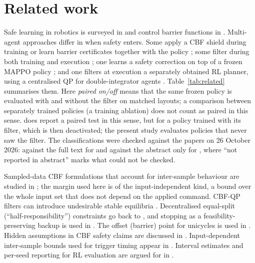 \documentclass[journal]{IEEEtran}
\begin{document}
\section{Related work}\label{sec:related}
Safe learning in robotics is surveyed in \cite{brunke2022} and control barrier functions in
\cite{ames2019}. Multi-agent approaches differ in when safety enters. Some apply a CBF shield during
training \cite{cai2021} or learn barrier certificates together with the policy
\cite{qin2021,zhang2025gcbf,zhang2025dgppo}; some filter during both training and execution
\cite{choi2025,dawood2025}; one learns a safety correction on top of a frozen MAPPO policy
\cite{deng2026}; and one filters at execution a separately obtained RL planner, using a centralised
QP for double-integrator agents \cite{vinod2022}. Table~\ref{tab:related} summarises them. Here
\emph{paired on/off} means that the same frozen policy is evaluated with and without the filter on
matched layouts; a comparison between separately trained policies (a training ablation) does not count
as paired in this sense. \cite{dawood2025} does report a paired test in this sense, but for a policy
trained with its filter, which is then deactivated; the present study evaluates policies that never
saw the filter. The classifications were checked against the papers on 26 October 2026: against the
full text for \cite{cai2021,choi2025,dawood2025,deng2026,vinod2022} and against the abstract only
for \cite{qin2021,zhang2025gcbf,zhang2025dgppo}, where ``not reported in abstract'' marks what could
not be checked.

Sampled-data CBF formulations that account for inter-sample behaviour are studied in
\cite{singletary2020,breeden2022,tan_zocbf,liu_sacbf}; the margin used here is of the
input-independent kind, a bound over the whole input set that does not depend on the applied command.
CBF-QP filters can introduce undesirable stable equilibria \cite{reis2021}. Decentralised equal-split
(``half-responsibility'') constraints go back to \cite{wang2017,vandenberg2011}, and stopping as a
feasibility-preserving backup is used in \cite{chen2021}. The offset (barrier) point for unicycles
is used in \cite{emam2019}. Hidden assumptions in CBF safety claims are discussed in
\cite{kim2026}. Input-dependent inter-sample bounds used for trigger timing appear in
\cite{yang2019}. Interval estimates and per-seed reporting for RL evaluation are argued for in
\cite{agarwal2021}.
\end{document}
